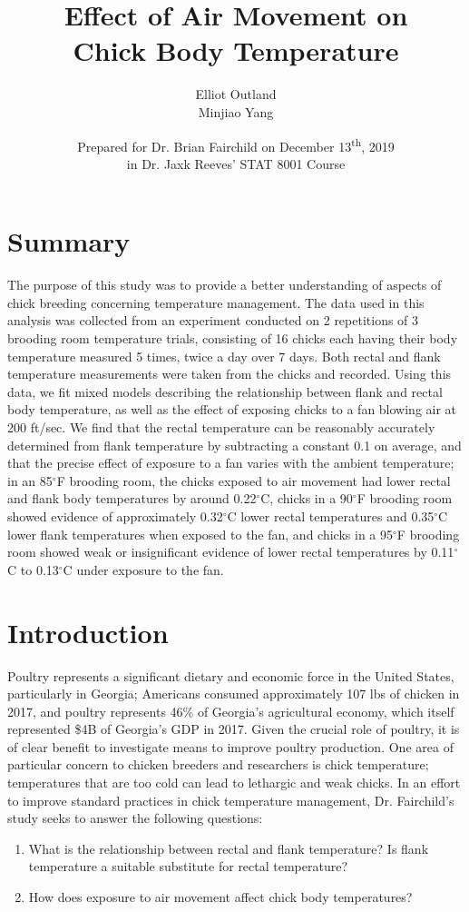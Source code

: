 \documentclass[a4paper, 10pt, titlepage]{article}
\title{Effect of Air Movement on\\Chick Body Temperature}
\author{
        Elliot Outland \\
        Minjiao Yang
        }
\date{Prepared for Dr. Brian Fairchild on December 13\textsuperscript{th}, 2019 \\ 
        in Dr. Jaxk Reeves' STAT 8001 Course}
\begin{document}
\maketitle
\tableofcontents
\listoffigures
\listoftables

\newpage

\section*{Summary}
The purpose of this study was to provide a better understanding of aspects of chick breeding concerning temperature management. The data used in this analysis was collected from an experiment conducted on 2 repetitions of 3 brooding room temperature trials, consisting of 16 chicks each having their body temperature measured 5 times, twice a day over 7 days. Both rectal and flank temperature measurements were taken from the chicks and recorded. Using this data, we fit mixed models describing the relationship between flank and rectal body temperature, as well as the effect of exposing chicks to a fan blowing air at 200 ft/sec. We find that the rectal temperature can be reasonably accurately determined from flank temperature by subtracting a constant 0.1 on average, and that the precise effect of exposure to a fan varies with the ambient temperature; in an 85$^{\circ}$F brooding room, the chicks exposed to air movement had lower rectal and flank body temperatures by around 0.22$^{\circ}$C, chicks in a 90$^{\circ}$F brooding room showed evidence of approximately 0.32$^{\circ}$C lower rectal temperatures and 0.35$^{\circ}$C lower flank temperatures when exposed to the fan, and chicks in a 95$^{\circ}$F brooding room showed weak or insignificant evidence of lower rectal temperatures by 0.11$^{\circ}$C to 0.13$^{\circ}$C under exposure to the fan.

\section{Introduction}
Poultry represents a significant dietary and economic force in the United States, particularly in Georgia; Americans consumed approximately 107 lbs of chicken in 2017, and poultry represents 46\% of Georgia's agricultural economy, which itself represented \$4B of Georgia's GDP in 2017. Given the crucial role of poultry, it is of clear benefit to investigate means to improve poultry production. One area of particular concern to chicken breeders and researchers is chick temperature; temperatures that are too cold can lead to lethargic and weak chicks. In an effort to improve standard practices in chick temperature management, Dr. Fairchild's study seeks to answer the following questions:
\begin{enumerate}[label = (\alph*)]
	\item
		What is the relationship between rectal and flank temperature? Is flank temperature a suitable substitute for rectal temperature?
	\item
		How does exposure to air movement affect chick body temperatures?
\end{enumerate}
\end{document}
